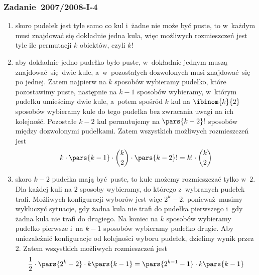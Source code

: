 \subsubsection*{Zadanie~2007/2008-I-4}
\begin{enumerate}[label={\alph*)}]
    \item skoro pudełek jest tyle samo co kul i~żadne nie może być puste, to w~każdym musi znajdować się dokładnie jedna kula, więc możliwych rozmieszczeń jest tyle ile permutacji \(k\) obiektów, czyli \(k!\)
    \item aby dokładnie jedno pudełko było puste, w~dokładnie jednym muszą znajdować się dwie kule, a~w~pozostałych dozwolonych musi znajdować się po jednej. Zatem najpierw na \(k\) sposobów wybieramy pudełko, które pozostawimy puste, następnie na \(k - 1\) sposobów wybieramy, w~którym pudełku umieścimy dwie kule, a~potem spośród \(k\) kul na \(\ibinom{k}{2}\) sposobów wybieramy kule do tego pudełka bez zwracania uwagi na ich kolejność. Pozostałe \(k - 2\) kul permutujemy na \(\pars{k - 2}!\) sposobów między dozwolonymi pudełkami. Zatem wszystkich możliwych rozmieszczeń jest
        \begin{equation*}
            k \cdot \pars{k - 1} \cdot \binom{k}{2} \cdot \pars{k - 2}!
                = k! \cdot \binom{k}{2}
        \end{equation*}
    \item skoro \(k - 2\) pudełka mają być puste, to kule możemy rozmieszczać tylko w~\(2\). Dla każdej kuli na \(2\) sposoby wybieramy, do którego z~wybranych pudełek trafi. Możliwych konfiguracji wyborów jest więc \(2^k - 2\), ponieważ musimy wykluczyć sytuacje, gdy żadna kula nie trafi do pudełka pierwszego i~gdy żadna kula nie trafi do drugiego. Na koniec na \(k\) sposobów wybieramy pudełko pierwsze i~na \(k - 1\) sposobów wybieramy pudełko drugie. Aby uniezależnić konfiguracje od kolejności wyboru pudełek, dzielimy wynik przez \(2\). Zatem wszystkich możliwych rozmieszczeń jest
        \begin{equation*}
            \frac{1}{2} \cdot \pars{2^k - 2} \cdot k\pars{k - 1}
                = \pars{2^{k - 1} - 1} \cdot k\pars{k - 1}
        \end{equation*}
\end{enumerate}
